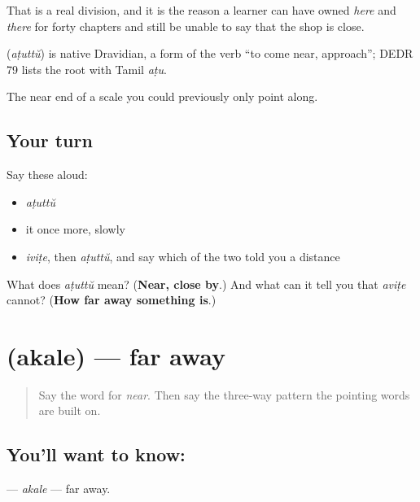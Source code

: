 That is a real division, and it is the reason a learner can have owned \emph{here} and \emph{there} for forty chapters and still be unable to say that the shop is close.

\begin{cousinweb}
\textbf{} (\emph{aṭuttŭ}) is native Dravidian, a form of the verb \textquotedblleft{}to come near, approach\textquotedblright{}; DEDR 79 lists the root with Tamil \emph{aṭu}.
\end{cousinweb}

\begin{grammarlens}[title={What you've built}]
The near end of a scale you could previously only point along.
\end{grammarlens}

\subsection*{Your turn}
Say these aloud:

\begin{itemize}
\raggedright
  \item \emph{aṭuttŭ}
  \item it once more, slowly
  \item \emph{iviṭe}, then \emph{aṭuttŭ}, and say which of the two told you a distance
\end{itemize}

\begin{tcolorbox}[breakable,colback=teal!4,colframe=teal!35!black,title={Before you move on}]
What does \emph{aṭuttŭ} mean? (\textbf{Near, close by}.) And what can it tell you that \emph{aviṭe} cannot? (\textbf{How far away something is}.)
\end{tcolorbox}
\section[\texorpdfstring{\ml{അകലെ} (akale)}{അകലെ (akale)}]{ (akale) — far away}

\label{lesson:ML-C81-akale}



\begin{quote}
Say the word for \emph{near}. Then say the three-way pattern the pointing words are built on.
\end{quote}

\subsection*{You'll want to know: }
\textbf{} — \emph{akale} — far away.

